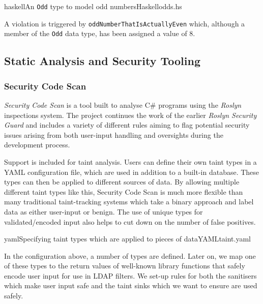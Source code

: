 \documentclass[a4paper,openany,12pt]{book}
\begin{document}
\begin{mycodefile}{haskell}{\label{code:liquidhaskell:1}An \texttt{Odd} type to model odd numbers}{Haskell}{odds.hs}
    
    A violation is triggered by \texttt{oddNumberThatIsActuallyEven} which, although a member of the \texttt{Odd} data
    type, has been assigned a value of 8.
    \vspace{0.5em}
\end{mycodefile}

\subsection{Static Analysis and Security Tooling}

\subsubsection{Security Code Scan}

\emph{Security Code Scan} is a tool built to analyse C\# programs using the \emph{Roslyn} inspections system.
The project continues the work of the earlier \emph{Roslyn Security Guard} and includes a variety of different rules
aiming to flag potential security issues arising from both user-input handling and oversights during the development
process.

Support is included for taint analysis.
Users can define their own taint types in a YAML configuration file, which are used in addition to a built-in database.
These types can then be applied to different sources of data.
By allowing multiple different taint types like this, Security Code Scan is much more flexible than many traditional
taint-tracking systems which take a binary approach and label data as either user-input or benign.
The use of unique types for validated/encoded input also helps to cut down on the number of false positives.


\begin{mycodefile}{yaml}{\label{code:scs:1}Specifying taint types which are applied to pieces of data}{YAML}{taint.yaml}
\end{mycodefile}

In the configuration above, a number of types are defined. Later on, we map one of these types to the return values of
well-known library functions that safely encode user input for use in LDAP filters.
We set-up rules for both the sanitisers which make user input safe and the taint sinks which we want to ensure are used
safely.
\end{document}
